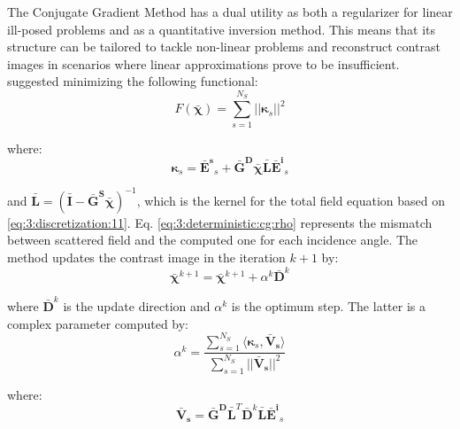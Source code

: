 			The Conjugate Gradient Method has a dual utility as both a regularizer for linear ill-posed problems and as a quantitative inversion method. This means that its structure can be tailored to tackle non-linear problems and reconstruct contrast images in scenarios where linear approximations prove to be insufficient. \cite{lobel1996conjugate} suggested minimizing the following functional:
			\begin{equation}
				F(\boldsymbol{\bar{\chi}}) = \sum\limits_{s=1}^{N_S} ||\boldsymbol{\kappa}_s||^2 \label{eq:3:deterministic:cg:functional}
			\end{equation}
			
			\noindent where:
			\begin{equation}
				\boldsymbol{\kappa}_s = \mathbf{\bar{E}^s}_s + \mathbf{\bar{G}^D}\boldsymbol{\bar{\chi}} \mathbf{\bar{L}} \mathbf{\bar{E}^i}_s \label{eq:3:deterministic:cg:rho}
			\end{equation}
		
			\noindent and $\mathbf{\bar{L}} = \left(\mathbf{\bar{I}-\mathbf{\bar{G}^S}}\boldsymbol{\bar{\chi}}\right)^{-1}$, which is the kernel for the total field equation based on \eqref{eq:3:discretization:11}. Eq. \eqref{eq:3:deterministic:cg:rho} represents the mismatch between scattered field and the computed one for each incidence angle. The method updates the contrast image in the iteration $k+1$ by:
			\begin{equation}
				\boldsymbol{\bar{\chi}}^{k+1} = \boldsymbol{\bar{\chi}}^{k+1} + \alpha^k \mathbf{\bar{D}}^k
			\end{equation}
		
			\noindent where $\mathbf{\bar{D}}^k$ is the update direction and $\alpha^k$ is the optimum step. The latter is a complex parameter computed by:
			\begin{equation}
				\alpha^k = \frac{\sum\limits_{s=1}^{N_S} \langle \boldsymbol{\kappa}_s, \mathbf{\bar{V}_s} \rangle}{\sum\limits_{s=1}^{N_S} ||\mathbf{\bar{V}_s}||^2}
			\end{equation}
		
			\noindent where:
			\begin{equation}
				\mathbf{\bar{V}_s} = \mathbf{\bar{G}^D}\mathbf{\bar{L}}^T \mathbf{\bar{D}}^k\mathbf{\bar{L}}\mathbf{\bar{E}^i}_s
			\end{equation}
		
